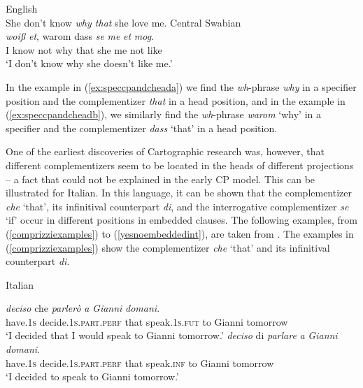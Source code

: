 \begin{exe}
\ex\begin{xlist} 
\ex English \\ She don't know \textit{why that} she love me. \label{ex:speccpandcheada}
\ex Central Swabian \\  {\textit{woi\ss }}  {\textit{et},} {warom} {dass} {\textit{se}} {\textit{me}} {\textit{et}} {\textit{mog}.} \\
{I} {know} {not} {why} {that} {she} {me} {not} {like} \\
\trans `I don't know why she doesn't like me.' \label{ex:speccpandcheadb}
\end{xlist}
\end{exe}

\noindent In the example in (\ref{ex:speccpandcheada}) we find the \textit{wh}-phrase \textit{why} in a specifier position and the complementizer \textit{that} in a head position, and in the example in (\ref{ex:speccpandcheadb}), we similarly find the \textit{wh}-phrase \textit{warom} `why' in a specifier and the complementizer \textit{dass} `that' in a head position. 

One of the earliest discoveries of Cartographic research was, however, that different complementizers seem to be located in the heads of different projections \citep{rizzi1997fine} -- a fact that could not be explained in the early CP model. This can be illustrated for Italian. In this language, it can be shown that the complementizer \textit{che} `that', its infinitival counterpart \textit{di}, and the interrogative complementizer \textit{se} `if' occur in different positions in embedded clauses. The following examples, from (\ref{comprizziexamples}) to (\ref{yesnoembeddedint}), are taken from \citet[205]{rizzi2013notes}. The examples in (\ref{comprizziexamples}) show the complementizer \textit{che} `that' and its infinitival counterpart \textit{di}.

\begin{exe}
\ex Italian \citep[205]{rizzi2013notes}\label{comprizziexamples}\begin{xlist} 
\ex {} {\textit{deciso}} {che} {\textit{parlerò}} {\textit{a}} {\textit{Gianni}} {\textit{domani}.} \\
{have.\textsc{1s}} {decide.\textsc{1s.part.perf}} {that} {speak.\textsc{1s.fut}} {to} {Gianni} {tomorrow} \\
\trans `I decided that I would speak to Gianni tomorrow.' \label{ex:comprizzia}
\ex {} {\textit{deciso}} {di} {\textit{parlare}} {\textit{a}} {\textit{Gianni}} {\textit{domani}.} \\
{have.\textsc{1s}} {decide.\textsc{1s.part.perf}} {that} {speak.\textsc{inf}} {to} {Gianni} {tomorrow} \\
\trans `I decided to speak to Gianni tomorrow.' \label{ex:comprizzib}
\end{xlist}
\end{exe}


